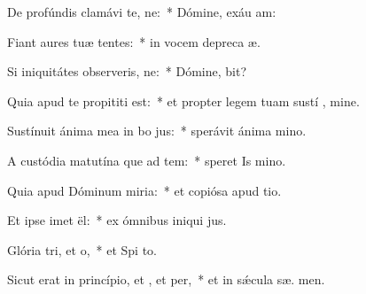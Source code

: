 \item De profúndis clamávi  te, ne:~* Dómine, exáu  am:
\item Fiant aures tuæ tentes:~* in vocem depreca æ.
\item Si iniquitátes observeris, ne:~* Dómine,  bit?
\item Quia apud te propititi est:~* et propter legem tuam sustí , mine.
\item Sustínuit ánima mea in bo jus:~* sperávit ánima   mino.
\item A custódia matutína que ad tem:~* speret Is  mino.
\item Quia apud Dóminum miria:~* et copiósa apud  tio.
\item Et ipse imet ël:~* ex ómnibus iniqui jus.
\item Glória tri, et o,~* et Spi to.
\item Sicut erat in princípio, et , et per,~* et in sǽcula sæ. men.
